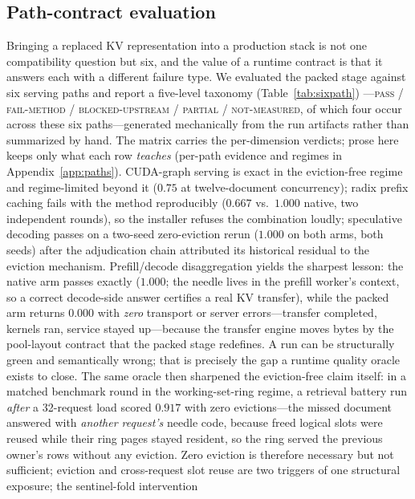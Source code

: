\documentclass[11pt]{article}
\begin{document}
\subsection{Path-contract evaluation}
\label{sec:pathcontract}
Bringing a replaced KV representation into a production stack is not one
compatibility question but six, and the value of a runtime contract is that
it answers each with a different failure type. We evaluated the packed
stage against six serving paths and report a five-level taxonomy
(Table~\ref{tab:sixpath})
---\textsc{pass} / \textsc{fail-method} / \textsc{blocked-upstream} /
\textsc{partial} / \textsc{not-measured}, of which four occur across these
six paths---generated mechanically from the
run artifacts rather than summarized by hand.
 The matrix carries the per-dimension verdicts;
prose here keeps only what each row \emph{teaches}
(per-path evidence and regimes in Appendix~\ref{app:paths}).
CUDA-graph serving is exact in the eviction-free regime and
regime-limited beyond it ($0.75$ at twelve-document concurrency);
radix prefix caching fails with the method reproducibly ($0.667$ vs.\
$1.000$ native, two independent rounds), so the installer refuses the
combination loudly; speculative decoding passes on a two-seed
zero-eviction rerun ($1.000$ on both arms, both seeds) after the
adjudication chain attributed its historical residual to the eviction
mechanism. Prefill/decode disaggregation yields the sharpest lesson: the
native arm passes exactly ($1.000$; the needle lives in the prefill
worker's context, so a correct decode-side answer certifies a real KV
transfer), while the packed arm returns $0.000$ with \emph{zero} transport
or server errors---transfer completed, kernels ran, service stayed
up---because the transfer engine moves bytes by the pool-layout contract
that the packed stage redefines. A run can be structurally green and
semantically wrong; that is precisely the gap a runtime quality oracle
exists to close. The same oracle then sharpened the eviction-free claim
itself: in a matched benchmark round in the working-set-ring regime, a
retrieval battery run \emph{after} a 32-request load scored $0.917$ with
zero evictions---the missed document answered with \emph{another
request's} needle code, because freed logical slots were reused while
their ring pages stayed resident, so the ring served the previous
owner's rows without any eviction. Zero eviction is therefore necessary
but not sufficient; eviction and cross-request slot reuse are two
triggers of one structural exposure; the sentinel-fold intervention
\end{document}
